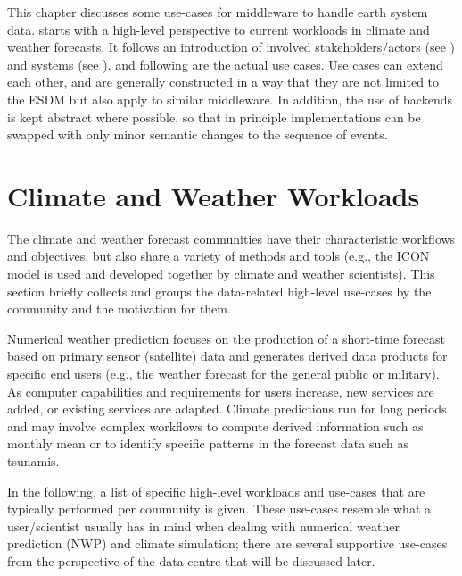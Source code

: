 
\begin{chapterIntro}
This chapter discusses some use-cases for middleware to handle earth system data.
 starts with a high-level perspective to current workloads in climate and weather forecasts.
It follows an introduction of involved stakeholders/actors (see ) and systems (see ).
 and following are the actual use cases.
Use cases can extend each other, and are generally constructed in a way that they are not limited to the ESDM but also apply to similar middleware.
In addition, the use of backends is kept abstract where possible, so that in principle implementations can be swapped with only minor semantic changes to the sequence of events.
\end{chapterIntro}



\section{Climate and Weather Workloads}
\label{sec:use cases/climate and weather}

The climate and weather forecast communities have their characteristic workflows and objectives, but also share a variety of methods and tools (e.g., the ICON model is used and developed together by climate and weather scientists).
This section briefly collects and groups the data-related high-level use-cases by the community and the motivation for them.

Numerical weather prediction focuses on the production of a short-time forecast based on primary sensor (satellite) data and generates derived data products for specific end users (e.g., the weather forecast for the general public or military).
As computer capabilities and requirements for users increase, new services are added, or existing services are adapted.
Climate predictions run for long periods and may involve complex workflows to compute derived information such as monthly mean or to identify specific patterns in the forecast data such as tsunamis.

In the following, a list of specific high-level workloads and use-cases that are typically performed per community is given.
These use-cases resemble what a user/scientist usually has in mind when dealing with numerical weather prediction (NWP) and climate simulation; there are several supportive use-cases from the perspective of the data centre that will be discussed later.


